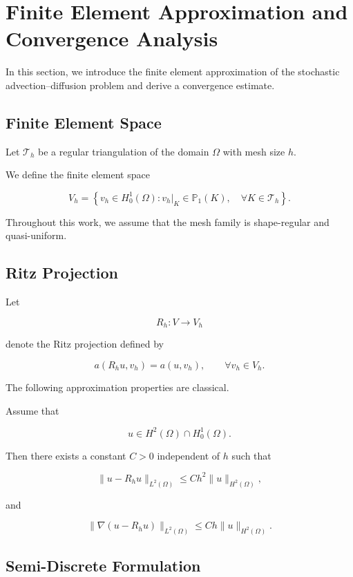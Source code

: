 \section{Finite Element Approximation and Convergence Analysis}

In this section, we introduce the finite element approximation of the stochastic advection--diffusion problem and derive a convergence estimate.

\subsection{Finite Element Space}

Let $\mathcal{T}_h$ be a regular triangulation of the domain $\Omega$ with mesh size $h$.

We define the finite element space

\[
V_h
=
\left\{
v_h\in H_0^1(\Omega)
:
v_h|_K \in \mathbb P_1(K),
\quad
\forall K\in\mathcal T_h
\right\}.
\]

Throughout this work, we assume that the mesh family is shape-regular and quasi-uniform.

\subsection{Ritz Projection}

Let

\[
R_h : V \rightarrow V_h
\]

denote the Ritz projection defined by

\[
a(R_hu,v_h)
=
a(u,v_h),
\qquad
\forall v_h\in V_h.
\]

The following approximation properties are classical.

\begin{lemma}
Assume that

\[
u\in H^2(\Omega)\cap H_0^1(\Omega).
\]

Then there exists a constant $C>0$ independent of $h$ such that

\[
\|u-R_hu\|_{L^2(\Omega)}
\le
Ch^2
\|u\|_{H^2(\Omega)},
\]

and

\[
\|\nabla(u-R_hu)\|_{L^2(\Omega)}
\le
Ch
\|u\|_{H^2(\Omega)}.
\]

\end{lemma}

\subsection{Semi-Discrete Formulation}

